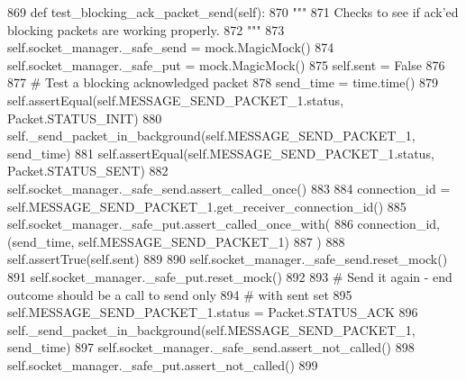 \begin{DoxyCode}
869     \textcolor{keyword}{def }test\_blocking\_ack\_packet\_send(self):
870         \textcolor{stringliteral}{"""}
871 \textcolor{stringliteral}{        Checks to see if ack'ed blocking packets are working properly.}
872 \textcolor{stringliteral}{        """}
873         self.socket\_manager.\_safe\_send = mock.MagicMock()
874         self.socket\_manager.\_safe\_put = mock.MagicMock()
875         self.sent = \textcolor{keyword}{False}
876 
877         \textcolor{comment}{# Test a blocking acknowledged packet}
878         send\_time = time.time()
879         self.assertEqual(self.MESSAGE\_SEND\_PACKET\_1.status, Packet.STATUS\_INIT)
880         self.\_send\_packet\_in\_background(self.MESSAGE\_SEND\_PACKET\_1, send\_time)
881         self.assertEqual(self.MESSAGE\_SEND\_PACKET\_1.status, Packet.STATUS\_SENT)
882         self.socket\_manager.\_safe\_send.assert\_called\_once()
883 
884         connection\_id = self.MESSAGE\_SEND\_PACKET\_1.get\_receiver\_connection\_id()
885         self.socket\_manager.\_safe\_put.assert\_called\_once\_with(
886             connection\_id, (send\_time, self.MESSAGE\_SEND\_PACKET\_1)
887         )
888         self.assertTrue(self.sent)
889 
890         self.socket\_manager.\_safe\_send.reset\_mock()
891         self.socket\_manager.\_safe\_put.reset\_mock()
892 
893         \textcolor{comment}{# Send it again - end outcome should be a call to send only}
894         \textcolor{comment}{# with sent set}
895         self.MESSAGE\_SEND\_PACKET\_1.status = Packet.STATUS\_ACK
896         self.\_send\_packet\_in\_background(self.MESSAGE\_SEND\_PACKET\_1, send\_time)
897         self.socket\_manager.\_safe\_send.assert\_not\_called()
898         self.socket\_manager.\_safe\_put.assert\_not\_called()
899 
\end{DoxyCode}
\mbox{\label{classparlai_1_1mturk_1_1core_1_1legacy__2018_1_1test_1_1test__socket__manager_1_1TestSocketManagerRoutingFunctionality_aed36a73c559aba644ea75bc934fe4459}} 
